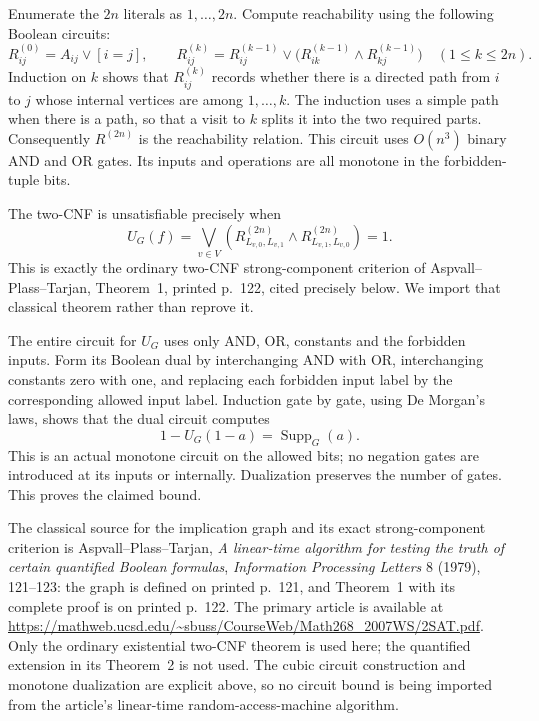 Enumerate the $2n$ literals as $1,\ldots,2n$.  Compute reachability
using the following Boolean circuits:
\[
 R^{(0)}_{ij}=A_{ij}\vee[i=j],\qquad
 R^{(k)}_{ij}=R^{(k-1)}_{ij}\vee
             \bigl(R^{(k-1)}_{ik}\wedge R^{(k-1)}_{kj}\bigr)
                     \quad(1\le k\le2n).
\]
Induction on $k$ shows that $R^{(k)}_{ij}$ records whether there is
a directed path from $i$ to $j$ whose internal vertices are among
$1,\ldots,k$.  The induction uses a simple path when there is a
path, so that a visit to $k$ splits it into the two required parts.
Consequently $R^{(2n)}$ is the reachability relation.  This circuit
uses $O(n^3)$ binary AND and OR gates.  Its inputs and operations
are all monotone in the forbidden-tuple bits.

The two-CNF is unsatisfiable precisely when
\[
 U_G(f)=\bigvee_{v\in V}
 \left(R^{(2n)}_{L_{v,0},L_{v,1}}\wedge
       R^{(2n)}_{L_{v,1},L_{v,0}}\right)=1.
\]
This is exactly the ordinary two-CNF strong-component criterion of
Aspvall--Plass--Tarjan, Theorem~1, printed p.~122, cited precisely
below.  We import that classical theorem rather than reprove it.

The entire circuit for $U_G$ uses only AND, OR, constants and the
forbidden inputs.  Form its Boolean dual by interchanging AND with
OR, interchanging constants zero with one, and replacing each
forbidden input label by the corresponding allowed input label.
Induction gate by gate, using De Morgan's laws, shows that the
dual circuit computes
\[
                            1-U_G(1-a)=\operatorname{Supp}_G(a).
\]
This is an actual monotone circuit on the allowed bits; no negation
gates are introduced at its inputs or internally.  Dualization
preserves the number of gates.  This proves the claimed bound.

The classical source for the implication graph and its exact
strong-component criterion is Aspvall--Plass--Tarjan,
\emph{A linear-time algorithm for testing the truth of certain
quantified Boolean formulas}, \emph{Information Processing Letters}
8 (1979), 121--123: the graph is defined on printed p.~121, and
Theorem~1 with its complete proof is on printed p.~122.
The primary article is available at
\url{https://mathweb.ucsd.edu/~sbuss/CourseWeb/Math268_2007WS/2SAT.pdf}.
Only the ordinary existential two-CNF theorem is used here; the
quantified extension in its Theorem~2 is not used.  The cubic circuit
construction and monotone dualization are explicit above, so no
circuit bound is being imported from the article's
linear-time random-access-machine algorithm.

